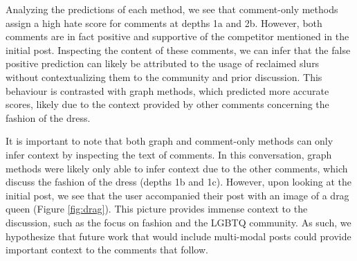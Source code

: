 \documentclass[letterpaper]{article} %
\begin{document}
Analyzing the predictions of each method, we see that comment-only methods assign a high hate score for comments at depths 1a and 2b. However, both comments are in fact positive and supportive of the competitor mentioned in the initial post. Inspecting the content of these comments, we can infer that the false positive prediction can likely be attributed to the usage of reclaimed slurs without contextualizing them to the community and prior discussion. This behaviour is contrasted with graph methods, which predicted more accurate scores, likely due to the context provided by other comments concerning the fashion of the dress.

It is important to note that both graph and comment-only methods can only infer context by inspecting the text of comments. In this conversation, graph methods were likely only able to infer context due to the other comments, which discuss the fashion of the dress (depths 1b and 1c).  However, upon looking at the initial post, we see that the user accompanied their post with an image of a drag queen (Figure \ref{fig:drag}). This picture provides immense context to the discussion, such as the focus on fashion and the LGBTQ community. As such, we hypothesize that future work that would include multi-modal posts could provide important context to the comments that follow.
\end{document}
